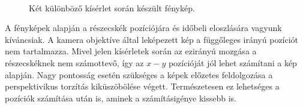 	\begin{figure}[H]
		\centering
		\\
		\caption{Két különböző kísérlet során készült fénykép.}
		\label{fig:captures}
	\end{figure}
	
	A fényképek alapján a részecskék pozíciójára és időbeli eloszlására vagyunk kíváncsiak.
	A kamera objektíve által leképezett kép a függőleges irányú pozíciót nem tartalmazza. Mivel jelen
	kísérletek során az ezirányú mozgása a részecskéknek nem számottevő, így az $x-y$ pozícióját jól
	lehet számítani a kép alapján. Nagy pontosság esetén szükséges a képek előzetes feldolgozása a
	perspektivikus torzítás kiküszöbölése végett. Természetesen ez lehetséges a pozíciók számítása után
	is, aminek a számításigénye kissebb is.



